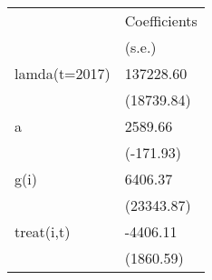 \begin{tabular}{ll}
\toprule
{} & Coefficients \\
{} &       (s.e.) \\
\midrule
lamda(t=2017) &    137228.60 \\
              &   (18739.84) \\
a             &      2589.66 \\
              &    (-171.93) \\
g(i)          &      6406.37 \\
              &   (23343.87) \\
treat(i,t)    &     -4406.11 \\
              &    (1860.59) \\
\bottomrule
\end{tabular}
